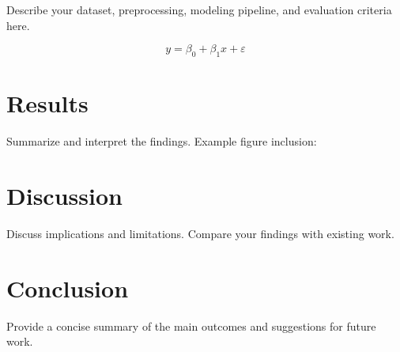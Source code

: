 \documentclass[final,3p,10.5pt]{elsarticle}
\begin{document}
Describe your dataset, preprocessing, modeling pipeline, and evaluation criteria here.

\begin{equation}
  y = \beta_0 + \beta_1 x + \varepsilon
\end{equation}

\section{Results}

Summarize and interpret the findings. Example figure inclusion:


\section{Discussion}

Discuss implications and limitations. Compare your findings with existing work.

\section{Conclusion}

Provide a concise summary of the main outcomes and suggestions for future work.


\end{document}
